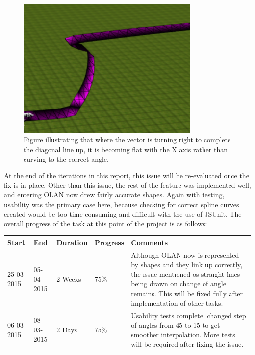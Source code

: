 \begin{figure}[h]
  \centering
      \includegraphics[width=0.8\textwidth]{images/issue.png}
  \caption{Figure illustrating that where the vector is turning right to complete the diagonal line up, it is becoming flat with the X axis rather than curving to the correct angle.}
  \label{fig:issue}
\end{figure}

At the end of the iterations in this report, this issue will be re-evaluated once the fix is in place. Other than this issue, the rest of the feature was implemented well, and entering OLAN now drew fairly accurate shapes. Again with testing, usability was the primary case here, because checking for correct spline curves created would be too time consuming and difficult with the use of JSUnit. The overall progress of the task at this point of the project is as follows:

\begin{table}[h]
\begin{tabular}{|l|l|l|l|p{7cm}|}
\hline
\textbf{Start} & \textbf{End} & \textbf{Duration} & \textbf{Progress} & \textbf{Comments}                                                                                                     \\ \hline
25-03-2015     & 05-04-2015   & 2 Weeks            & 75\%             &  Although OLAN now is represented by shapes and they link up correctly, the issue mentioned os straight lines being drawn on change of angle remains. This will be fixed fully after implementation of other tasks.\\ \hline
06-03-2015     & 08-03-2015   & 2 Days            & 75\%             &  Usability tests complete, changed step of angles from 45 to 15 to get smoother interpolation. More tests will be required after fixing the issue.\\ \hline
\end{tabular}
\end{table}

